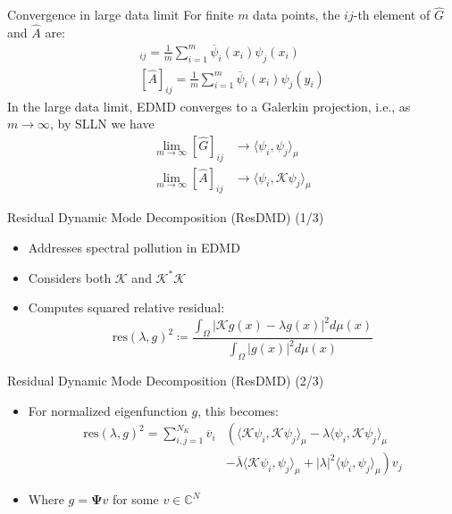 \documentclass{beamer}
\begin{document}
	\begin{frame}{Convergence in large data limit}
		For finite $m$ data points, the $ij$-th element of $\widehat{G}$ and $\widehat{A}$ are:
		\begin{gather*}
			[\widehat{G}]_{ij} = \frac{1}{m}\sum_{i=1}^m \overline{\psi}_i(x_i)\psi_j(x_i) \\
			[\widehat{A}]_{ij} = \frac{1}{m}\sum_{i=1}^m \overline{\psi}_i(x_i)\psi_j(y_i)
		\end{gather*}
		In the large data limit, EDMD converges to a Galerkin projection, i.e., as $m\to\infty$, by SLLN we have 
		\begin{align*}
			\lim_{m\to\infty}[\widehat{G}]_{ij} &\to \langle \psi_i, \psi_j \rangle_{\mu} \\
			\lim_{m\to\infty}[\widehat{A}]_{ij} &\to \langle \psi_i, \mathcal{K}\psi_j \rangle_{\mu}
		\end{align*}
		
	\end{frame}
	
	\begin{frame}{Residual Dynamic Mode Decomposition (ResDMD) (1/3)}
		\begin{itemize}
			\item Addresses spectral pollution in EDMD
			\item Considers both $\mathcal{K}$ and $\mathcal{K}^*\mathcal{K}$
			\item Computes squared relative residual:
			\[ \text{res}(\lambda, g)^2 \coloneqq \frac{\int_\Omega |\mathcal{K}g(x) - \lambda g(x)|^2 d\mu(x)}{\int_\Omega |g(x)|^2 d\mu(x)} \]
		\end{itemize}
	\end{frame}
	
	\begin{frame}{Residual Dynamic Mode Decomposition (ResDMD) (2/3)}
		\begin{itemize}
			\item For normalized eigenfunction $g$, this becomes:
			\begin{align*}
				\text{res}(\lambda, g)^2 = \sum_{i,j=1}^{N_K} \overline{v}_i & \left( \langle \mathcal{K}\psi_i, \mathcal{K}\psi_j \rangle_\mu - \lambda \langle \psi_i, \mathcal{K}\psi_j \rangle_\mu \right. \\
				& \left. - \overline{\lambda} \langle \mathcal{K}\psi_i, \psi_j \rangle_\mu + |\lambda|^2 \langle \psi_i, \psi_j \rangle_\mu \right) v_j
			\end{align*}
			\item Where $g = \mathbf{\Psi} v$ for some $v \in \mathbb{C}^N$
		\end{itemize}
	\end{frame}
	
\end{document}
